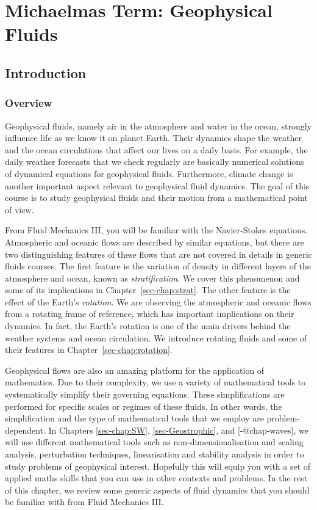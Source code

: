 \documentclass[
  letterpaper,
  twocolumn,
  landscape]{report}
\begin{document}
\part{Michaelmas Term: Geophysical Fluids}

\hypertarget{introduction}{%
\chapter{Introduction}\label{introduction}}

\hypertarget{overview}{%
\section{Overview}\label{overview}}

Geophysical fluids, namely air in the atmosphere and water in the ocean,
strongly influence life as we know it on planet Earth. Their dynamics
shape the weather and the ocean circulations that affect our lives on a
daily basis. For example, the daily weather forecasts that we check
regularly are basically numerical solutions of dynamical equations for
geophysical fluids. Furthermore, climate change is another important
aspect relevant to geophysical fluid dynamics. The goal of this course
is to study geophysical fluids and their motion from a mathematical
point of view.

From Fluid Mechanics III, you will be familiar with the Navier-Stokes
equations. Atmospheric and oceanic flows are described by similar
equations, but there are two distinguishing features of these flows that
are not covered in details in generic fluids courses. The first feature
is the variation of density in different layers of the atmosphere and
ocean, known as \emph{stratification}. We cover this phenomenon and some
of its implications in Chapter~\ref{sec-chap:strat}. The other feature
is the effect of the Earth's \emph{rotation}. We are observing the
atmospheric and oceanic flows from a rotating frame of reference, which
has important implications on their dynamics. In fact, the Earth's
rotation is one of the main drivers behind the weather systems and ocean
circulation. We introduce rotating fluids and some of their features in
Chapter~\ref{sec-chap:rotation}.

Geophysical flows are also an amazing platform for the application of
mathematics. Due to their complexity, we use a variety of mathematical
tools to systematically simplify their governing equations. These
simplifications are performed for specific scales or regimes of these
fluids. In other words, the simplification and the type of mathematical
tools that we employ are problem-dependent. In Chapters
\ref{sec-chap:SW}, \ref{sec-Geostrophic}, and {[}-@chap-waves{]}, we
will use different mathematical tools such as non-dimensionalisation and
scaling analysis, perturbation techniques, linearisation and stability
analysis in order to study problems of geophysical interest. Hopefully
this will equip you with a set of applied maths skills that you can use
in other contexts and problems. In the rest of this chapter, we review
some generic aspects of fluid dynamics that you should be familiar with
from Fluid Mechanics III.
\end{document}
